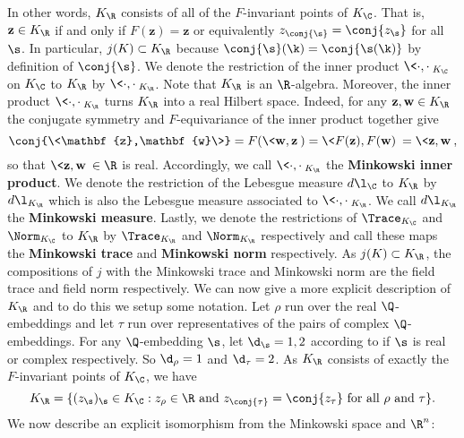    In other words, $K_{\R}$ consists of all of the $F$-invariant points of $K_{\C}$. That is, $\mathbf{z} \in K_{\R}$ if and only if $F(\mathbf{z}) = \mathbf{z}$ or equivalently $z_{\conj{\s}} = \conj{z_{\s}}$ for all $\s$. In particular, $j(K) \subset K_{\R}$ because $\conj{\s}(\k) = \conj{\s(\k)}$ by definition of $\conj{\s}$. We denote the restriction of the inner product $\<\cdot,\cdot\>_{K_{\C}}$ on $K_{\C}$ to $K_{\R}$ by $\<\cdot,\cdot\>_{K_{\R}}$. Note that $K_{\R}$ is an $\R$-algebra. Moreover, the inner product $\<\cdot,\cdot\>_{K_{\R}}$ turns $K_{\R}$ into a real Hilbert space. Indeed, for any $\mathbf{z},\mathbf{w} \in K_{\R}$ the conjugate symmetry and $F$-equivariance of the inner product together give
    \[
      \conj{\<\mathbf{z},\mathbf{w}\>} = F(\<\mathbf{w},\mathbf{z}\>) = \<F(\mathbf{z}),F(\mathbf{w})\> = \<\mathbf{z},\mathbf{w}\>,
    \]
    so that $\<\mathbf{z},\mathbf{w}\> \in \R$ is real. Accordingly, we call $\<\cdot,\cdot\>_{K_{\R}}$ the \textbf{Minkowski inner product}. We denote the restriction of the Lebesgue measure $d\l_{\C}$ to $K_{\R}$ by $d\l_{K_{\R}}$ which is also the Lebesgue measure associated to $\<\cdot,\cdot\>_{K_{\R}}$. We call $d\l_{K_{\R}}$ the \textbf{Minkowski measure}. Lastly, we denote the restrictions of $\Trace_{K_{\C}}$ and $\Norm_{K_{\C}}$ to $K_{\R}$ by $\Trace_{K_{\R}}$ and $\Norm_{K_{\R}}$ respectively and call these maps the \textbf{Minkowski trace} and \textbf{Minkowski norm} respectively. As $j(K) \subset K_{\R}$, the compositions of $j$ with the Minkowski trace and Minkowski norm are the field trace and field norm respectively. We can now give a more explicit description of $K_{\R}$ and to do this we setup some notation. Let $\rho$ run over the real $\Q$-embeddings and let $\tau$ run over representatives of the pairs of complex $\Q$-embeddings. For any $\Q$-embedding $\s$, let $\d_{\s} = 1,2$ according to if $\s$ is real or complex respectively. So $\d_{\rho} = 1$ and $\d_{\tau} = 2$. As $K_{\R}$ consists of exactly the $F$-invariant points of $K_{\C}$, we have
    \[
      K_{\R} = \{(z_{\s})_{\s} \in K_{\C}:\text{$z_{\rho} \in \R$ and $z_{\conj{\tau}} = \conj{z_{\tau}}$ for all $\rho$ and $\tau$}\}.
    \]
    We now describe an explicit isomorphism from the Minkowski space and $\R^{n}$:
    
